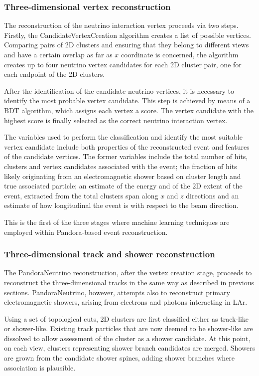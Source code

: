 \subsubsection{Three-dimensional vertex reconstruction}

The reconstruction of the neutrino interaction vertex proceeds via two steps. Firstly, the CandidateVertexCreation algorithm creates a list of possible vertices. Comparing pairs of 2D clusters and ensuring that they belong to different views and have a certain overlap as far as $x$ coordinate is concerned, the algorithm creates up to four neutrino vertex candidates for each 2D cluster pair, one for each endpoint of the 2D clusters. 

After the identification of the candidate neutrino vertices, it is necessary to identify the most probable vertex candidate. This step is achieved by means of a BDT algorithm, which assigns each vertex a score. The vertex candidate with the highest score is finally selected as the correct neutrino interaction vertex. 

The variables used to perform the classification and identify the most suitable vertex candidate include both properties of the reconstructed event and features of the candidate vertices. The former variables include the total number of hits, clusters and vertex candidates associated with the event; the fraction of hits likely originating from an electromagnetic shower based on cluster length and true associated particle; an estimate of the energy and of the 2D extent of the event, extracted from the total clusters span along $x$ and $z$ directions and an estimate of how longitudinal the event is with respect to the beam direction. 

This is the first of the three stages where machine learning techniques are employed within Pandora-based event reconstruction. 

\subsubsection{Three-dimensional track and shower reconstruction}

The PandoraNeutrino reconstruction, after the vertex creation stage, proceeds to reconstruct the three-dimensional tracks in the same way as described in previous sections. PandoraNeutrino, however, attempts also to reconstruct primary electromagnetic showers, arising from electrons and photons interacting in LAr. 

Using a set of topological cuts, 2D clusters are first classified either as track-like or shower-like. Existing track particles that are now deemed to be shower-like are dissolved to allow assessment of the cluster as a shower candidate. At this point, on each view, clusters representing shower branch candidates are merged. Showers are grown from the candidate shower spines, adding shower branches where association is plausible. 

